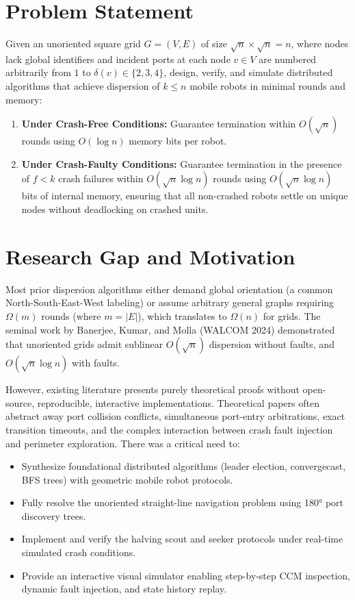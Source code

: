 \documentclass[11pt,a4paper]{report}
\begin{document}
\section{Problem Statement}
Given an unoriented square grid $G = (V, E)$ of size $\sqrt{n} \times \sqrt{n} = n$, where nodes lack global identifiers and incident ports at each node $v \in V$ are numbered arbitrarily from $1$ to $\delta(v) \in \{2, 3, 4\}$, design, verify, and simulate distributed algorithms that achieve dispersion of $k \le n$ mobile robots in minimal rounds and memory:
\begin{enumerate}
    \item \textbf{Under Crash-Free Conditions:} Guarantee termination within $O(\sqrt{n})$ rounds using $O(\log n)$ memory bits per robot.
    \item \textbf{Under Crash-Faulty Conditions:} Guarantee termination in the presence of $f < k$ crash failures within $O(\sqrt{n} \log n)$ rounds using $O(\sqrt{n} \log n)$ bits of internal memory, ensuring that all non-crashed robots settle on unique nodes without deadlocking on crashed units.
\end{enumerate}

\section{Research Gap and Motivation}
Most prior dispersion algorithms either demand global orientation (a common North-South-East-West labeling) or assume arbitrary general graphs requiring $\Omega(m)$ rounds (where $m = |E|$), which translates to $\Omega(n)$ for grids. The seminal work by Banerjee, Kumar, and Molla (WALCOM 2024) demonstrated that unoriented grids admit sublinear $O(\sqrt{n})$ dispersion without faults, and $O(\sqrt{n} \log n)$ with faults.

However, existing literature presents purely theoretical proofs without open-source, reproducible, interactive implementations. Theoretical papers often abstract away port collision conflicts, simultaneous port-entry arbitrations, exact transition timeouts, and the complex interaction between crash fault injection and perimeter exploration. There was a critical need to:
\begin{itemize}
    \item Synthesize foundational distributed algorithms (leader election, convergecast, BFS trees) with geometric mobile robot protocols.
    \item Fully resolve the unoriented straight-line navigation problem using 180° port discovery trees.
    \item Implement and verify the halving scout and seeker protocols under real-time simulated crash conditions.
    \item Provide an interactive visual simulator enabling step-by-step CCM inspection, dynamic fault injection, and state history replay.
\end{itemize}
\end{document}
